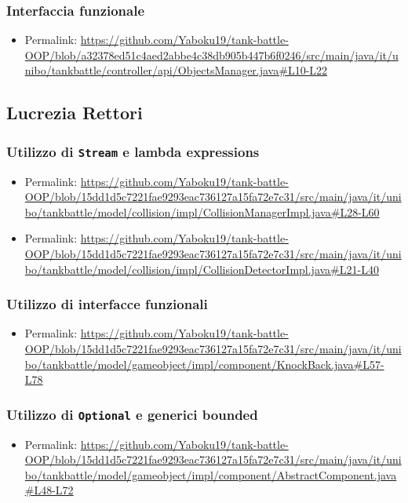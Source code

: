 \documentclass[a4paper,12pt]{report}
\begin{document}
\subsubsection*{Interfaccia funzionale}
\begin{itemize}
    \item Permalink: \url{https://github.com/Yaboku19/tank-battle-OOP/blob/a32378ed51c4aed2abbe4c38db905b447b6f0246/src/main/java/it/unibo/tankbattle/controller/api/ObjectsManager.java#L10-L22}
\end{itemize}
%
\newpage
\subsection*{Lucrezia Rettori}
\subsubsection*{Utilizzo di \texttt{Stream} e lambda expressions}
\begin{itemize}
    \item Permalink: \url{https://github.com/Yaboku19/tank-battle-OOP/blob/15dd1d5c7221fae9293eac736127a15fa72e7c31/src/main/java/it/unibo/tankbattle/model/collision/impl/CollisionManagerImpl.java#L28-L60}
    \item Permalink: \url{https://github.com/Yaboku19/tank-battle-OOP/blob/15dd1d5c7221fae9293eac736127a15fa72e7c31/src/main/java/it/unibo/tankbattle/model/collision/impl/CollisionDetectorImpl.java#L21-L40}
\end{itemize}
\subsubsection*{Utilizzo di interfacce funzionali}
\begin{itemize}
	\item Permalink: \url{https://github.com/Yaboku19/tank-battle-OOP/blob/15dd1d5c7221fae9293eac736127a15fa72e7c31/src/main/java/it/unibo/tankbattle/model/gameobject/impl/component/KnockBack.java#L57-L78}
\end{itemize}
\subsubsection*{Utilizzo di \texttt{Optional} e generici bounded}
\begin{itemize}
	\item Permalink: \url{https://github.com/Yaboku19/tank-battle-OOP/blob/15dd1d5c7221fae9293eac736127a15fa72e7c31/src/main/java/it/unibo/tankbattle/model/gameobject/impl/component/AbstractComponent.java#L48-L72}
\end{itemize}
%
\end{document}
